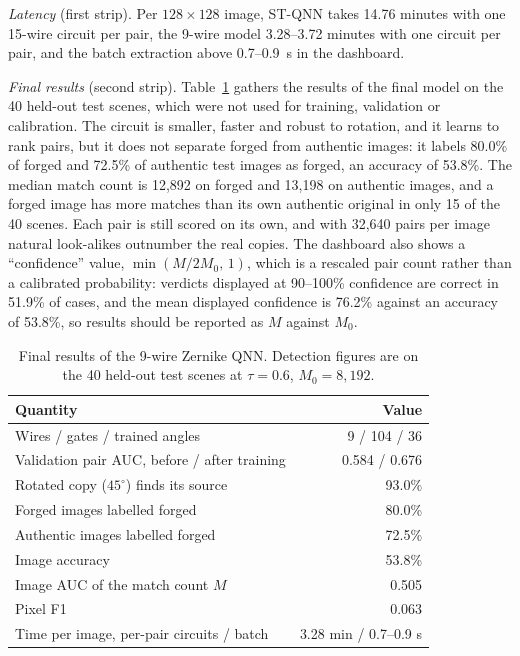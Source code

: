 \documentclass[conference]{IEEEtran}
\begin{document}
\emph{Latency} (first strip). Per $128\times128$ image, ST-QNN takes 14.76 minutes with one 15-wire circuit per pair, the 9-wire model 3.28--3.72 minutes with one circuit per pair, and the batch extraction above 0.7--0.9~s in the dashboard.

\emph{Final results} (second strip). Table~\ref{tab:zfinal} gathers the results of the final model on the 40 held-out test scenes, which were not used for training, validation or calibration. The circuit is smaller, faster and robust to rotation, and it learns to rank pairs, but it does not separate forged from authentic images: it labels 80.0\% of forged and 72.5\% of authentic test images as forged, an accuracy of 53.8\%. The median match count is 12,892 on forged and 13,198 on authentic images, and a forged image has more matches than its own authentic original in only 15 of the 40 scenes. Each pair is still scored on its own, and with 32,640 pairs per image natural look-alikes outnumber the real copies. The dashboard also shows a ``confidence'' value, $\min(M/2M_0,\,1)$, which is a rescaled pair count rather than a calibrated probability: verdicts displayed at 90--100\% confidence are correct in 51.9\% of cases, and the mean displayed confidence is 76.2\% against an accuracy of 53.8\%, so results should be reported as $M$ against $M_0$.

\begin{table}[!htb]
\centering
\caption{Final results of the 9-wire Zernike QNN. Detection figures are on the 40 held-out test scenes at $\tau = 0.6$, $M_0 = 8{,}192$.}
\label{tab:zfinal}
\setlength{\tabcolsep}{4pt}
\begin{tabular}{lr}
\toprule
\textbf{Quantity} & \textbf{Value}\\
\midrule
Wires / gates / trained angles & 9 / 104 / 36\\
Validation pair AUC, before / after training & 0.584 / 0.676\\
Rotated copy ($45^\circ$) finds its source & 93.0\%\\
Forged images labelled forged & 80.0\%\\
Authentic images labelled forged & 72.5\%\\
Image accuracy & 53.8\%\\
Image AUC of the match count $M$ & 0.505\\
Pixel F1 & 0.063\\
Time per image, per-pair circuits / batch & 3.28 min / 0.7--0.9 s\\
\bottomrule
\end{tabular}
\end{table}
\end{document}

